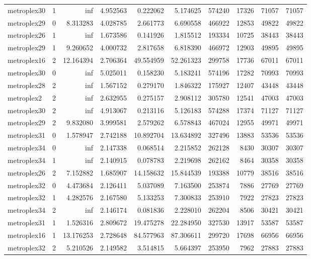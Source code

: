 \begin{longtable}{|l|r|r|r|r|r|r|r|r|r|}
metroplex30 & 1 & inf & 4.952563 & 0.222062 & 5.174625 & 574240 & 17326 & 71057 & 71057 \\
metroplex29 & 0 & 8.313283 & 4.028785 & 2.661773 & 6.690558 & 466922 & 12853 & 49822 & 49822 \\
metroplex26 & 1 & inf & 1.673586 & 0.141926 & 1.815512 & 193334 & 10725 & 38443 & 38443 \\
metroplex29 & 1 & 9.260652 & 4.000732 & 2.817658 & 6.818390 & 466972 & 12903 & 49895 & 49895 \\
metroplex16 & 2 & 12.164394 & 2.706364 & 49.554959 & 52.261323 & 299758 & 17736 & 67011 & 67011 \\
metroplex30 & 0 & inf & 5.025011 & 0.158230 & 5.183241 & 574196 & 17282 & 70993 & 70993 \\
metroplex28 & 2 & inf & 1.567152 & 0.279170 & 1.846322 & 175927 & 12407 & 43448 & 43448 \\
metroplex2 & 2 & inf & 2.632955 & 0.275157 & 2.908112 & 305780 & 12541 & 47003 & 47003 \\
metroplex30 & 2 & inf & 4.913067 & 0.213116 & 5.126183 & 574288 & 17374 & 71127 & 71127 \\
metroplex29 & 2 & 9.832080 & 3.999581 & 2.579262 & 6.578843 & 467024 & 12955 & 49971 & 49971 \\
metroplex31 & 0 & 1.578947 & 2.742188 & 10.892704 & 13.634892 & 327496 & 13883 & 53536 & 53536 \\
metroplex34 & 0 & inf & 2.147338 & 0.068514 & 2.215852 & 262128 & 8430 & 30307 & 30307 \\
metroplex34 & 1 & inf & 2.140915 & 0.078783 & 2.219698 & 262162 & 8464 & 30358 & 30358 \\
metroplex26 & 2 & 7.152882 & 1.685907 & 14.158632 & 15.844539 & 193388 & 10779 & 38516 & 38516 \\
metroplex32 & 0 & 4.473684 & 2.126411 & 5.037089 & 7.163500 & 253874 & 7886 & 27769 & 27769 \\
metroplex32 & 1 & 4.282576 & 2.167580 & 5.133253 & 7.300833 & 253910 & 7922 & 27823 & 27823 \\
metroplex34 & 2 & inf & 2.146174 & 0.081836 & 2.228010 & 262204 & 8506 & 30421 & 30421 \\
metroplex31 & 1 & 1.526316 & 2.809672 & 19.475278 & 22.284950 & 327530 & 13917 & 53587 & 53587 \\
metroplex16 & 1 & 13.176253 & 2.728648 & 84.577963 & 87.306611 & 299720 & 17698 & 66956 & 66956 \\
metroplex32 & 2 & 5.210526 & 2.149582 & 3.514815 & 5.664397 & 253950 & 7962 & 27883 & 27883 \\

\end{longtable}
